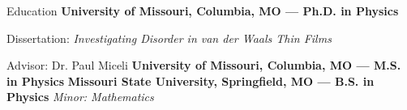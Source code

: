 \begin{rubric}{Education}
    \textbf{University of Missouri, Columbia, MO --- Ph.D. in Physics}
    \par Dissertation: \emph{Investigating Disorder in van der Waals Thin Films}
    \par Advisor: Dr. Paul Miceli
  \entry*[May 2022]%
    \textbf{University of Missouri, Columbia, MO --- M.S. in Physics}
  \entry*[May 2020]%
    \textbf{Missouri State University, Springfield, MO --- B.S. in Physics} \hfill \textit{Minor: Mathematics}
\end{rubric}

